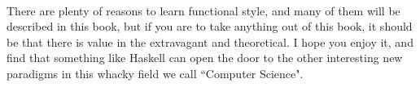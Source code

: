 \begin{foreword}
\paragraph{}
There are plenty of reasons to learn functional style, and many of them will be described in this book, but if you are to take anything out of this book, it should be that there is value in the extravagant and theoretical. I hope you enjoy it, and find that something like Haskell can open the door to the other interesting new paradigms in this whacky field we call ``Computer Science". 

\end{foreword}

